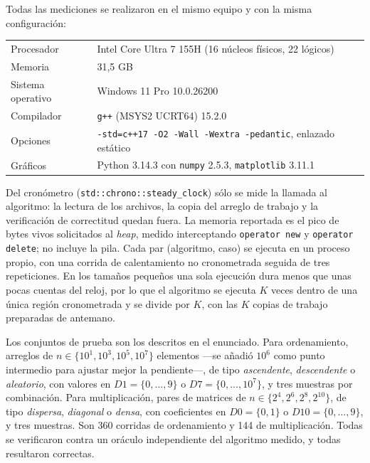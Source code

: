 
Todas las mediciones se realizaron en el mismo equipo y con la misma
configuración:

\begin{center}
\begin{tabular}{ll}
\hline
Procesador        & Intel Core Ultra 7 155H (16 núcleos físicos, 22 lógicos) \\
Memoria           & 31,5 GB \\
Sistema operativo & Windows 11 Pro 10.0.26200 \\
Compilador        & \texttt{g++} (MSYS2 UCRT64) 15.2.0 \\
Opciones          & \texttt{-std=c++17 -O2 -Wall -Wextra -pedantic}, enlazado estático \\
Gráficos          & Python 3.14.3 con \texttt{numpy} 2.5.3, \texttt{matplotlib} 3.11.1 \\
\hline
\end{tabular}
\end{center}

Del cronómetro (\texttt{std::chrono::steady\_clock}) sólo se mide la llamada al
algoritmo: la lectura de los archivos, la copia del arreglo de trabajo y la
verificación de correctitud quedan fuera. La memoria reportada es el pico de
bytes vivos solicitados al \emph{heap}, medido interceptando \texttt{operator
new} y \texttt{operator delete}; no incluye la pila. Cada par (algoritmo, caso)
se ejecuta en un proceso propio, con una corrida de calentamiento no
cronometrada seguida de tres repeticiones. En los tamaños pequeños una sola
ejecución dura menos que unas pocas cuentas del reloj, por lo que el algoritmo
se ejecuta $K$ veces dentro de una única región cronometrada y se divide por
$K$, con las $K$ copias de trabajo preparadas de antemano.

Los conjuntos de prueba son los descritos en el enunciado. Para ordenamiento,
arreglos de $n \in \{10^1, 10^3, 10^5, 10^7\}$ elementos ---se añadió $10^6$
como punto intermedio para ajustar mejor la pendiente---, de tipo
\emph{ascendente}, \emph{descendente} o \emph{aleatorio}, con valores en
$D1 = \{0,\dots,9\}$ o $D7 = \{0,\dots,10^7\}$, y tres muestras por combinación.
Para multiplicación, pares de matrices de $n \in \{2^4, 2^6, 2^8, 2^{10}\}$, de
tipo \emph{dispersa}, \emph{diagonal} o \emph{densa}, con coeficientes en
$D0 = \{0,1\}$ o $D10 = \{0,\dots,9\}$, y tres muestras. Son 360 corridas de
ordenamiento y 144 de multiplicación. Todas se verificaron contra un oráculo
independiente del algoritmo medido, y todas resultaron correctas.
